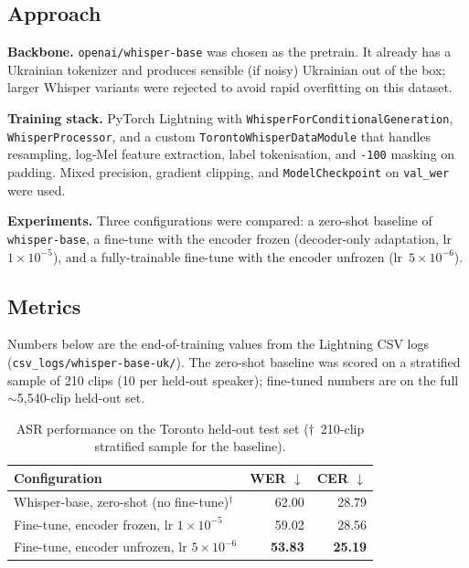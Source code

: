 \documentclass[11pt]{article}
\begin{document}
\subsection{Approach}
\textbf{Backbone.} \texttt{openai/whisper-base} was chosen as the pretrain.
It already has a Ukrainian tokenizer and produces sensible (if noisy)
Ukrainian out of the box; larger Whisper variants were rejected to avoid
rapid overfitting on this dataset.

\noindent\textbf{Training stack.} PyTorch Lightning with
\texttt{WhisperForConditionalGeneration}, \texttt{WhisperProcessor}, and a
custom \texttt{TorontoWhisperDataModule} that handles resampling, log-Mel
feature extraction, label tokenisation, and \texttt{-100} masking on padding.
Mixed precision, gradient clipping, and \texttt{ModelCheckpoint} on
\texttt{val\_wer} were used.

\noindent\textbf{Experiments.} Three configurations were compared: a zero-shot
baseline of \texttt{whisper-base}, a fine-tune with the encoder frozen
(decoder-only adaptation, lr~$1\!\times\!10^{-5}$), and a fully-trainable
fine-tune with the encoder unfrozen (lr~$5\!\times\!10^{-6}$).

\subsection{Metrics}
Numbers below are the end-of-training values from the Lightning CSV logs
(\texttt{csv\_logs/whisper-base-uk/}). The zero-shot baseline was scored on a
stratified sample of 210 clips (10 per held-out speaker); fine-tuned numbers
are on the full $\sim$5{,}540-clip held-out set.

\begin{table}[h]
\centering
\begin{tabular}{lrr}
\toprule
\textbf{Configuration} & \textbf{WER $\downarrow$} & \textbf{CER $\downarrow$} \\
\midrule
Whisper-base, zero-shot (no fine-tune)$^{\dagger}$        & 62.00 & 28.79 \\
Fine-tune, encoder frozen, lr $1\!\times\!10^{-5}$        & 59.02 & 28.56 \\
Fine-tune, encoder unfrozen, lr $5\!\times\!10^{-6}$      & \textbf{53.83} & \textbf{25.19} \\
\bottomrule
\end{tabular}
\caption{ASR performance on the Toronto held-out test set
($\dagger$~210-clip stratified sample for the baseline).}
\end{table}
\end{document}
